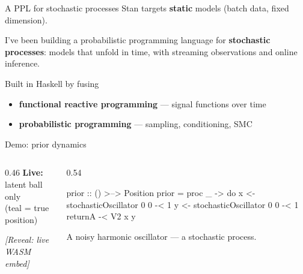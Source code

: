 \begin{frame}{A PPL for stochastic processes}
  Stan targets \textbf{static} models (batch data, fixed dimension).

  \vspace{0.5em}
  I've been building a probabilistic programming language for
  \textbf{stochastic processes}: models that unfold in time,
  with streaming observations and online inference.

  \vspace{0.6em}
  Built in Haskell by fusing
  \begin{itemize}\setlength\itemsep{0.25em}
    \item \textbf{functional reactive programming} --- signal functions over time
    \item \textbf{probabilistic programming} --- sampling, conditioning, SMC
  \end{itemize}
\end{frame}


\begin{frame}[fragile]{Demo: prior dynamics}
  \begin{columns}[T]
    \begin{column}{0.46\textwidth}
      \textbf{Live:} latent ball only\\[0.3em]
      {\small (teal = true position)}
      \vspace{1.2em}

      {\scriptsize\textit{[Reveal: live WASM embed]}}
    \end{column}
    \begin{column}{0.54\textwidth}
\begin{semiverbatim}
prior :: () >--> Position
prior = proc _ -> do
  x <- stochasticOscillator 0 0 -< 1
  y <- stochasticOscillator 0 0 -< 1
  returnA -< V2 x y
\end{semiverbatim}
      \vspace{0.4em}
      {\small A noisy harmonic oscillator --- a stochastic process.}
    \end{column}
  \end{columns}
\end{frame}

